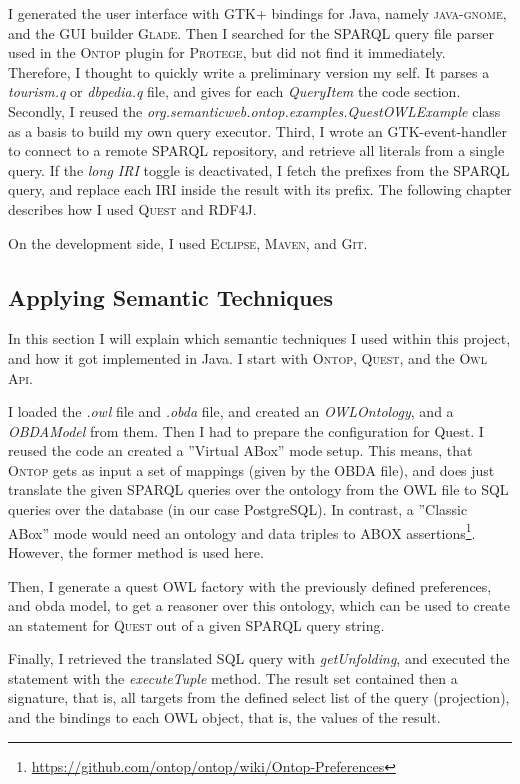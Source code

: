 I generated the user interface with GTK+ bindings for Java, namely \textsc{java-gnome}, and the GUI builder \textsc{Glade}. Then I searched for the SPARQL query file parser used in the \textsc{Ontop} plugin for \textsc{Protege}, but did not find it immediately. Therefore, I thought to quickly write a preliminary version my self. It parses a \textit{tourism.q} or \textit{dbpedia.q} file, and gives for each \textit{QueryItem} the code section.  Secondly, I reused the \textit{org.semanticweb.ontop.examples.QuestOWLExample} class as a basis to build my own query executor. Third, I wrote an GTK-event-handler to connect to a remote SPARQL repository, and retrieve all literals from a single query. If the \textit{long IRI} toggle is deactivated, I fetch the prefixes from the SPARQL query, and replace each IRI inside the result with its prefix. The following chapter describes how I used \textsc{Quest} and \textsc{RDF4J}.

On the development side, I used \textsc{Eclipse}, \textsc{Maven}, and \textsc{Git}.

\subsection{Applying Semantic Techniques}
In this section I will explain which semantic techniques I used within this project, and how it got implemented in Java. I start with \textsc{Ontop}, \textsc{Quest}, and the \textsc{Owl Api}.

I loaded the \textit{.owl} file and \textit{.obda} file, and created an \textit{OWLOntology}, and a \textit{OBDAModel} from them. Then I had to prepare the configuration for Quest. I reused the code an created a ''Virtual ABox'' mode setup. This means,  that \textsc{Ontop} gets as input a set of mappings (given by the OBDA file), and does just translate the given SPARQL queries over the ontology from the OWL file to SQL queries over the database (in our case PostgreSQL). In contrast, a ''Classic ABox'' mode would need an ontology and data triples to ABOX assertions\footnote{\url{https://github.com/ontop/ontop/wiki/Ontop-Preferences}}. However, the former method is used here.

Then, I generate a quest OWL factory with the previously defined preferences, and obda model, to get a reasoner over this ontology, which can be used to create an statement for \textsc{Quest} out of a given SPARQL query string.

Finally, I retrieved the translated SQL query with \textit{getUnfolding}, and executed the statement with the \textit{executeTuple} method. The result set contained then a signature, that is, all targets from the defined select list of the query (projection), and the bindings to each OWL object, that is, the values of the result.

